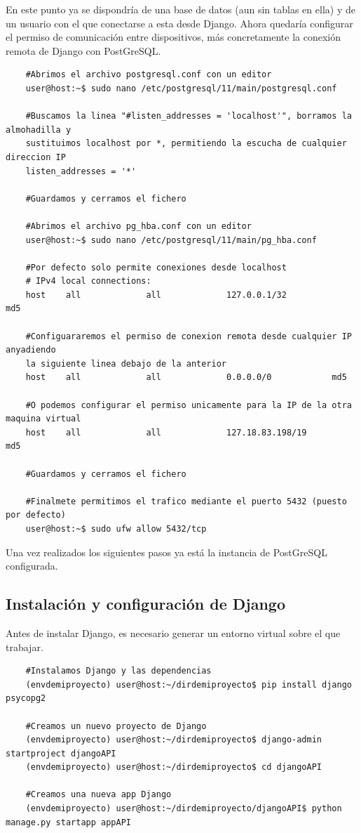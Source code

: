 En este punto ya se dispondría de una base de datos (aun sin tablas en ella) y de un usuario con el que conectarse a esta desde Django.\newline
\newline
Ahora quedaría configurar el permiso de comunicación entre dispositivos, más concretamente la conexión remota de Django con PostGreSQL.

\begin{lstlisting}
	#Abrimos el archivo postgresql.conf con un editor
	user@host:~$ sudo nano /etc/postgresql/11/main/postgresql.conf
	
	#Buscamos la linea "#listen_addresses = 'localhost'", borramos la almohadilla y
	sustituimos localhost por *, permitiendo la escucha de cualquier direccion IP
	listen_addresses = '*'
	
	#Guardamos y cerramos el fichero
	
	#Abrimos el archivo pg_hba.conf con un editor
	user@host:~$ sudo nano /etc/postgresql/11/main/pg_hba.conf
	
	#Por defecto solo permite conexiones desde localhost
	# IPv4 local connections: 
	host    all             all             127.0.0.1/32            md5 
	
	#Configuararemos el permiso de conexion remota desde cualquier IP anyadiendo
	la siguiente linea debajo de la anterior
	host    all             all             0.0.0.0/0            md5 
	
	#O podemos configurar el permiso unicamente para la IP de la otra maquina virtual
	host    all             all             127.18.83.198/19            md5 
	
	#Guardamos y cerramos el fichero
	
	#Finalmete permitimos el trafico mediante el puerto 5432 (puesto por defecto)
	user@host:~$ sudo ufw allow 5432/tcp
\end{lstlisting}

Una vez realizados los siguientes pasos ya está la instancia de PostGreSQL configurada.

\subsection{Instalación y configuración de Django}
Antes de instalar Django, es necesario generar un entorno virtual sobre el que trabajar.

\begin{lstlisting}
	#Instalamos Django y las dependencias
	(envdemiproyecto) user@host:~/dirdemiproyecto$ pip install django psycopg2
	
	#Creamos un nuevo proyecto de Django
	(envdemiproyecto) user@host:~/dirdemiproyecto$ django-admin startproject djangoAPI
	(envdemiproyecto) user@host:~/dirdemiproyecto$ cd djangoAPI
	
	#Creamos una nueva app Django
	(envdemiproyecto) user@host:~/dirdemiproyecto/djangoAPI$ python manage.py startapp appAPI
\end{lstlisting}

